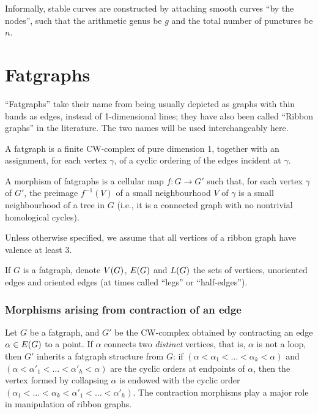 Informally, stable curves are constructed by attaching smooth curves
``by the nodes'', such that the arithmetic genus be $g$ and the total
number of punctures be $n$.



\section{Fatgraphs}
\label{sec:fatgraphs}

``Fatgraphs'' take their name from being usually depicted as graphs
with thin bands as edges, instead of 1-dimensional lines; they have
also been called ``Ribbon graphs'' in the literature.  The two names
will be used interchangeably here.

\begin{definition}
  \label{dfn:fatgraphs}
  A fatgraph is a finite CW-complex of pure dimension 1, together
  with an assignment, for each vertex $\gamma$, of a cyclic ordering of the
  edges incident at $\gamma$.

  A morphism of fatgraphs is a cellular map $f:G\to G'$ such that,
  for each vertex $\gamma$ of $G'$, the preimage $f^{-1}(V)$ of a small
  neighbourhood $V$ of $\gamma$ is a small neighbourhood of a tree in $G$
  (i.e., it is a connected graph with no nontrivial homological
  cycles).
\end{definition}
Unless otherwise specified, we assume that all vertices of a ribbon
graph have valence at least 3.

If $G$ is a fatgraph, denote $V(G)$, $E(G)$ and
$L(G)$ the sets of vertices, unoriented edges and oriented edges
(at times called ``legs'' or ``half-edges'').

\subsubsection{Morphisms arising from contraction of an edge}
\label{sec:contractions}
Let $G$ be a fatgraph, and $G'$ be the CW-complex obtained by
contracting an edge $\alpha \in E(G)$ to a point.  If $\alpha$ connects two
\emph{distinct} vertices, that is, $\alpha$ is not a loop, then $G'$
inherits a fatgraph structure from $G$: if $(\alpha < \alpha_1 < \ldots < \alpha_k <
\alpha)$ and $(\alpha < \alpha'_1 < ... < \alpha'_h < \alpha)$ are the cyclic orders at
endpoints of $\alpha$, then the vertex formed by collapsing $\alpha$ is endowed
with the cyclic order $(\alpha_1 < \ldots < \alpha_k < \alpha'_1 < \ldots < \alpha'_h)$.  The
contraction morphisms play a major role in manipulation of ribbon
graphs.

